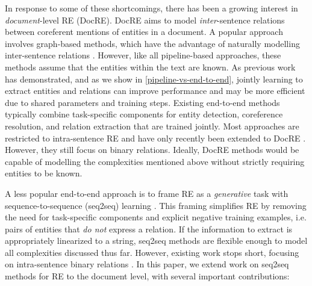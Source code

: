 \documentclass[11pt]{article}
\begin{document}
In response to some of these shortcomings, there has been a growing interest in \textit{document}-level RE (DocRE). DocRE aims to model \textit{inter}-sentence relations between coreferent mentions of entities in a document. A popular approach involves graph-based methods, which have the advantage of naturally modelling inter-sentence relations \citep{peng2017cross, song-etal-2018-n, christopoulou-etal-2019-connecting, nan-etal-2020-reasoning, minh-tran-etal-2020-dots}. However, like all pipeline-based approaches, these methods assume that the entities within the text are known. As previous work has demonstrated, and as we show in \textsection \ref{pipeline-vs-end-to-end}, jointly learning to extract entities and relations can improve performance \citep{miwa2014modeling, miwa2016end, gupta2016table, li2016joint, li2017neural, nguyen2019, yu2020joint} and may be more efficient due to shared parameters and training steps. Existing end-to-end methods typically combine task-specific components for entity detection, coreference resolution, and relation extraction that are trained jointly. Most approaches are restricted to intra-sentence RE \citep{bekoulis2018joint, Luan2018MultiTaskIO, nguyen2019end, wadden-etal-2019-entity, giorgi2019end} and have only recently been extended to DocRE \citep{eberts-ulges-2021-end}. However, they still focus on binary relations. Ideally, DocRE methods would be capable of modelling the complexities mentioned above without strictly requiring entities to be known.

A less popular end-to-end approach is to frame RE as a \textit{generative} task with sequence-to-sequence (seq2seq) learning \citep{sutskever2014sequence}. This framing simplifies RE by removing the need for task-specific components and explicit negative training examples, i.e. pairs of entities that \textit{do not} express a relation. If the information to extract is appropriately linearized to a string, seq2seq methods are flexible enough to model all complexities discussed thus far. However, existing work stops short, focusing on intra-sentence binary relations \citep{zeng-etal-2018-extracting, Zhang2020MinimizeEB, nayak2020effective, Zeng2020CopyMTLCM}. In this paper, we extend work on seq2seq methods for RE to the document level, with several important contributions:
\end{document}
